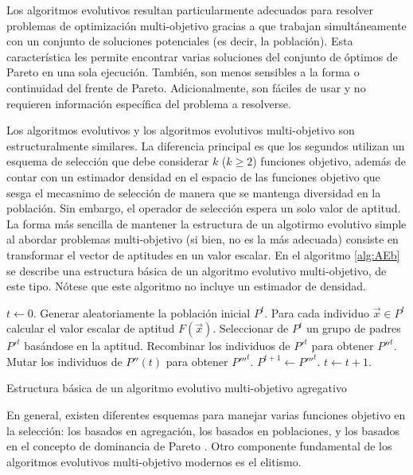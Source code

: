   Los algoritmos evolutivos resultan particularmente adecuados para resolver problemas de optimizaci\'on multi-objetivo gracias a que
  trabajan simult\'aneamente con un conjunto de soluciones potenciales (es decir, la poblaci\'on). Esta caracter\'istica les permite 
  encontrar varias soluciones del conjunto de \'optimos de Pareto en una sola ejecuci\'on. Tambi\'en, son menos sensibles a la forma o 
  continuidad del frente de Pareto. Adicionalmente, son f\'aciles de usar y no requieren informaci\'on espec\'ifica del problema a resolverse.

  Los algoritmos evolutivos y los algoritmos evolutivos multi-objetivo son estructuralmente similares. La diferencia principal es que 
  los segundos utilizan un esquema de selecci\'on que debe considerar $k$ ($k \geq 2$) funciones objetivo, adem\'as de contar
  con un estimador densidad en el espacio de las funciones objetivo que sesga el mecasnimo de selecci\'on de manera 
  que se mantenga diversidad en la poblaci\'on. 
  Sin embargo, el operador de selecci\'on espera un solo valor de aptitud. La forma m\'as sencilla de mantener 
  la estructura de un algotirmo evolutivo simple al abordar problemas multi-objetivo (si bien, no es la m\'as adecuada) consiste en 
  transformar el vector de aptitudes en un valor escalar. En el algoritmo \ref{alg:AEb} se describe una estructura b\'asica de un 
  algoritmo evolutivo multi-objetivo, de este tipo. N\'otese que este algoritmo no incluye un estimador de densidad.
  
  \begin{algorithm}
      \begin{algorithmic}[1]			
	\STATE $t \leftarrow 0$.
	\STATE Generar aleatoriamente la poblaci\'on inicial $P^t$.
	\STATE Para cada individuo $\vec{x} \in P^t$ calcular el valor escalar de aptitud $F(\vec{x})$.
	\STATE Seleccionar de $P^t$ un grupo de padres $P'^t$ bas\'andose en la aptitud.
	\STATE Recombinar los individuos de $P'^t$ para obtener $P''^t.$
	\STATE Mutar los individuos de $P''(t)$ para obtener $P'''^t$.
	\STATE $P^{t+1 } \leftarrow P'''^t$.
	\STATE $t\leftarrow t +1$.
	\ENDWHILE 
  \end{algorithmic}
  \caption{Estructura b\'asica de un algoritmo evolutivo multi-objetivo agregativo}
  \label{alg:AEb}
  \end{algorithm}

  En general, existen diferentes esquemas para manejar varias funciones objetivo en la selecci\'on: los basados en agregaci\'on, los basados 
  en poblaciones, y los basados en el concepto de dominancia de Pareto \cite{Zitzler99}. Otro componente fundamental de los algoritmos
  evolutivos multi-objetivo modernos es el elitismo.


